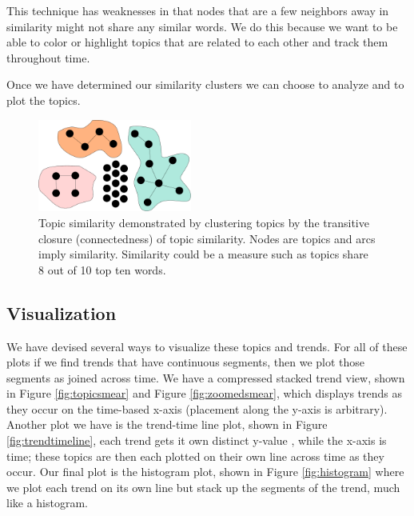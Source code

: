 \documentclass[times, 10pt,twocolumn]{article}
\begin{document}
This technique has weaknesses in that nodes that are a few neighbors
away in similarity might not share any similar words.  We do this
because we want to be able to color or highlight topics that are
related to each other and track them throughout time.

Once we have determined our similarity clusters we can choose to
analyze and to plot the topics.

\begin{figure}
  \centering
  \includegraphics[width=0.45\textwidth]{transitiveclosure}
  \caption{Topic similarity demonstrated by clustering topics by the transitive closure (connectedness)
    of topic similarity. Nodes are topics and
    arcs imply similarity. Similarity could be a measure such as
    topics share 8 out of 10 top ten words.}
\label{fig:closure}
\end{figure}



\subsection{Visualization}

We have devised several ways to visualize these topics and trends.
For all of these plots if we find trends that have continuous
segments, then we plot those segments as joined across time.  We have
a compressed stacked trend view, shown in Figure \ref{fig:topicsmear}
and Figure \ref{fig:zoomedsmear}, which displays trends as they occur
on the time-based x-axis (placement along the y-axis is arbitrary).
Another plot we have is the trend-time line plot, shown in Figure
\ref{fig:trendtimeline}, each trend gets it own distinct y-value ,
while the x-axis is time; these topics are then each plotted on their
own line across time as they occur. Our final plot is the histogram
plot, shown in Figure \ref{fig:histogram} where we plot each trend on
its own line but stack up the segments of the trend, much like a
histogram.
\end{document}
